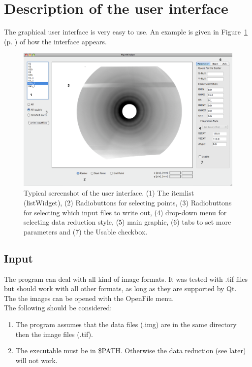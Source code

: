 \section{Description of the user interface}\label{interface} 
The graphical user interface is very easy to use. An example is given in Figure~\ref{ui} (p. \pageref{ui}) of how the interface appears. 

\begin{figure}
\includegraphics[width=20cm, angle=90]{ui.png}
\caption{Typical screenshot of the user interface. (1) The itemlist (listWidget), (2) Radiobuttons for selecting points, (3) Radiobuttons for selecting which input files to write out, (4) drop-down menu for selecting data reduction style, (5) main graphic, (6) tabs to set more parameters and (7) the Usable checkbox. }
\label{ui} 
\end{figure} 

\subsection{Input}
The program can deal with all kind of image formats. It was tested with .tif files but should work with all other formats, as long as they are supported by Qt. \\
The the images can be opened with the OpenFile menu. \\
The following should be considered:
\begin{enumerate}
\item The program assumes that the data files (.img) are in the same directory then the image files (.tif). 
\item The executable must be in \$PATH. Otherwise the data reduction (see later) will not work. 
\end{enumerate}

